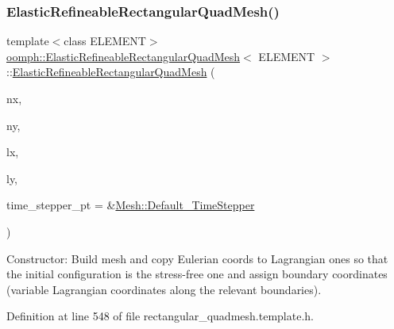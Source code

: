 \subsubsection{\texorpdfstring{Elastic\+Refineable\+Rectangular\+Quad\+Mesh()}{ElasticRefineableRectangularQuadMesh()}\hspace{0.1cm}{\footnotesize\ttfamily [1/3]}}
{\footnotesize\ttfamily template$<$class E\+L\+E\+M\+E\+NT$>$ \\
\hyperlink{classoomph_1_1ElasticRefineableRectangularQuadMesh}{oomph\+::\+Elastic\+Refineable\+Rectangular\+Quad\+Mesh}$<$ E\+L\+E\+M\+E\+NT $>$\+::\hyperlink{classoomph_1_1ElasticRefineableRectangularQuadMesh}{Elastic\+Refineable\+Rectangular\+Quad\+Mesh} (\begin{DoxyParamCaption}\item[{const unsigned \&}]{nx,  }\item[{const unsigned \&}]{ny,  }\item[{const double \&}]{lx,  }\item[{const double \&}]{ly,  }\item[{\hyperlink{classoomph_1_1TimeStepper}{Time\+Stepper} $\ast$}]{time\+\_\+stepper\+\_\+pt = {\ttfamily \&\hyperlink{classoomph_1_1Mesh_a12243d0fee2b1fcee729ee5a4777ea10}{Mesh\+::\+Default\+\_\+\+Time\+Stepper}} }\end{DoxyParamCaption})\hspace{0.3cm}{\ttfamily [inline]}}



Constructor\+: Build mesh and copy Eulerian coords to Lagrangian ones so that the initial configuration is the stress-\/free one and assign boundary coordinates (variable Lagrangian coordinates along the relevant boundaries). 



Definition at line 548 of file rectangular\+\_\+quadmesh.\+template.\+h.

\mbox{\label{classoomph_1_1ElasticRefineableRectangularQuadMesh_a8925d6c0eb669afc420564a4610b34bd}} 
